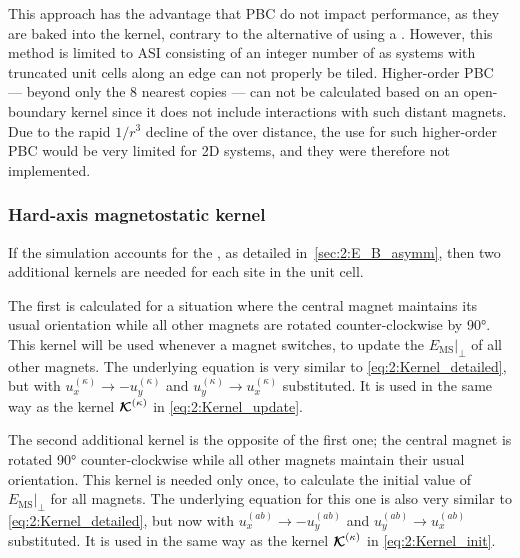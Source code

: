 This approach has the advantage that PBC do not impact performance, as they are baked into the kernel, contrary to the alternative of using a .
However, this method is limited to ASI consisting of an integer number of  as systems with truncated unit cells along an edge can not properly be tiled.
Higher-order PBC --- beyond only the 8 nearest copies --- can not be calculated based on an open-boundary kernel since it does not include interactions with such distant magnets.
Due to the rapid $1/r^3$ decline of the  over distance, the use for such higher-order PBC would be very limited for 2D systems, and they were therefore not implemented.

\subsubsection{Hard-axis magnetostatic kernel}\label{sec:2:Kernels:Perp}
If the simulation accounts for the , as detailed in~\cref{sec:2:E_B_asymm}, then two additional kernels are needed for each site in the unit cell. \par
The first is calculated for a situation where the central magnet maintains its usual orientation while all other magnets are rotated counter-clockwise by \ang{90}.
This kernel will be used whenever a magnet switches, to update the  $\left. E_{\mathrm{MS}} \right|_{\perp}$ of all other magnets.
The underlying equation is very similar to \cref{eq:2:Kernel_detailed}, but with $u_x^{(\kappa)} \rightarrow -u_y^{(\kappa)}$ and $u_y^{(\kappa)} \rightarrow u_x^{(\kappa)}$ substituted.
It is used in the same way as the kernel $\boldsymbol{\mathbf{\mathcal{K}}}^{(\kappa)}$ in \cref{eq:2:Kernel_update}. \par
The second additional kernel is the opposite of the first one; the central magnet is rotated \ang{90} counter-clockwise while all other magnets maintain their usual orientation.
This kernel is needed only once, to calculate the initial value of $\left. E_{\mathrm{MS}} \right|_{\perp}$ for all magnets.
The underlying equation for this one is also very similar to \cref{eq:2:Kernel_detailed}, but now with $u_x^{(ab)} \rightarrow -u_y^{(ab)}$ and $u_y^{(ab)} \rightarrow u_x^{(ab)}$ substituted.
It is used in the same way as the kernel $\boldsymbol{\mathbf{\mathcal{K}}}^{(\kappa)}$ in \cref{eq:2:Kernel_init}.

